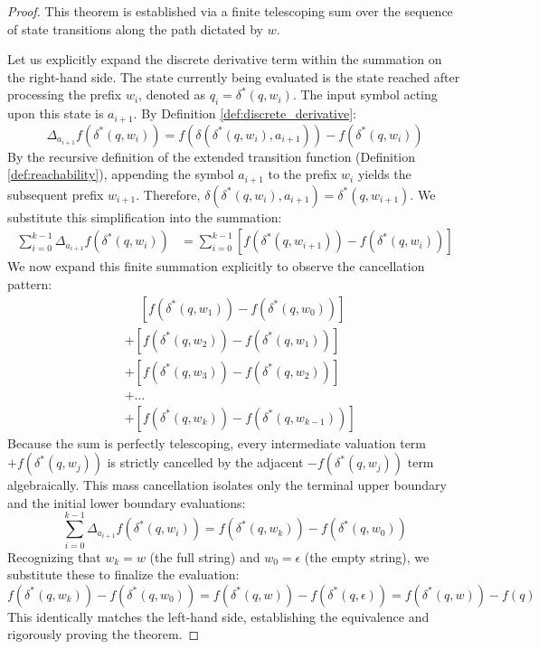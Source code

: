\begin{proof}
This theorem is established via a finite telescoping sum over the sequence of state transitions along the path dictated by $w$.

Let us explicitly expand the discrete derivative term within the summation on the right-hand side. The state currently being evaluated is the state reached after processing the prefix $w_i$, denoted as $q_i = \delta^*(q, w_i)$. The input symbol acting upon this state is $a_{i+1}$. By Definition \ref{def:discrete_derivative}:
\[
\Delta_{a_{i+1}} f(\delta^*(q, w_i)) = f(\delta(\delta^*(q, w_i), a_{i+1})) - f(\delta^*(q, w_i))
\]
By the recursive definition of the extended transition function (Definition \ref{def:reachability}), appending the symbol $a_{i+1}$ to the prefix $w_i$ yields the subsequent prefix $w_{i+1}$. Therefore, $\delta(\delta^*(q, w_i), a_{i+1}) = \delta^*(q, w_{i+1})$. We substitute this simplification into the summation:
\begin{align*}
\sum_{i=0}^{k-1} \Delta_{a_{i+1}} f(\delta^*(q, w_i)) &= \sum_{i=0}^{k-1} \left[ f(\delta^*(q, w_{i+1})) - f(\delta^*(q, w_i)) \right]
\end{align*}
We now expand this finite summation explicitly to observe the cancellation pattern:
\begin{align*}
& \phantom{+} \left[ f(\delta^*(q, w_1)) - f(\delta^*(q, w_0)) \right] \\
& + \left[ f(\delta^*(q, w_2)) - f(\delta^*(q, w_1)) \right] \\
& + \left[ f(\delta^*(q, w_3)) - f(\delta^*(q, w_2)) \right] \\
& + \dots \\
& + \left[ f(\delta^*(q, w_k)) - f(\delta^*(q, w_{k-1})) \right]
\end{align*}
Because the sum is perfectly telescoping, every intermediate valuation term $+f(\delta^*(q, w_j))$ is strictly cancelled by the adjacent $-f(\delta^*(q, w_j))$ term algebraically. This mass cancellation isolates only the terminal upper boundary and the initial lower boundary evaluations:
\[
\sum_{i=0}^{k-1} \Delta_{a_{i+1}} f(\delta^*(q, w_i)) = f(\delta^*(q, w_k)) - f(\delta^*(q, w_0))
\]
Recognizing that $w_k = w$ (the full string) and $w_0 = \epsilon$ (the empty string), we substitute these to finalize the evaluation:
\[
f(\delta^*(q, w_k)) - f(\delta^*(q, w_0)) = f(\delta^*(q, w)) - f(\delta^*(q, \epsilon)) = f(\delta^*(q, w)) - f(q)
\]
This identically matches the left-hand side, establishing the equivalence and rigorously proving the theorem. 
\end{proof}

